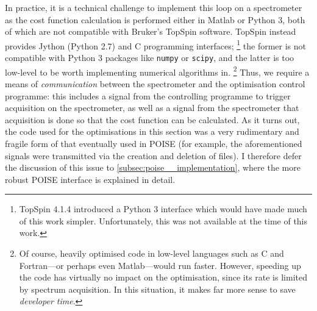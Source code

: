 In practice, it is a technical challenge to implement this loop on a spectrometer as the cost function calculation is performed either in Matlab or Python 3, both of which are not compatible with Bruker's TopSpin software.
TopSpin instead provides Jython (Python 2.7) and C programming interfaces;%
\footnote{TopSpin 4.1.4 introduced a Python 3 interface which would have made much of this work simpler. Unfortunately, this was not available at the time of this work.}
the former is not compatible with Python 3 packages like \texttt{numpy} or \texttt{scipy}, and the latter is too low-level to be worth implementing numerical algorithms in.%
\footnote{Of course, heavily optimised code in low-level languages such as C and Fortran---or perhaps even Matlab---would run faster. However, speeding up the code has virtually no impact on the optimisation, since its rate is limited by spectrum acquisition. In this situation, it makes far more sense to save \textit{developer time}.}
Thus, we require a means of \textit{communication} between the spectrometer and the optimisation control programme: this includes a signal from the controlling programme to trigger acquisition on the spectrometer, as well as a signal from the spectrometer that acquisition is done so that the cost function can be calculated.
As it turns out, the code used for the optimisations in this section was a very rudimentary and fragile form of that eventually used in POISE (for example, the aforementioned signals were transmitted via the creation and deletion of files).
I therefore defer the discussion of this issue to \cref{subsec:poise__implementation}, where the more robust POISE interface is explained in detail.

